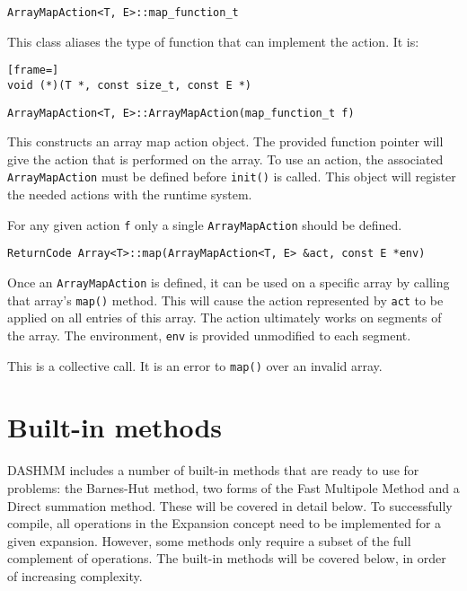 \begin{lstlisting}
ArrayMapAction<T, E>::map_function_t
\end{lstlisting}

\noindent This class aliases the type of function that can implement the
action. It is:

\begin{lstlisting}[frame=]
void (*)(T *, const size_t, const E *)
\end{lstlisting}

\begin{lstlisting}
ArrayMapAction<T, E>::ArrayMapAction(map_function_t f)
\end{lstlisting}

\noindent This constructs an array map action object. The provided function
pointer
will give the action that is performed on the array. To use an action,
the associated \texttt{ArrayMapAction} must be defined before \texttt{init()} is
called. This object will register the needed actions with the runtime system.

For any given action \texttt{f} only a single \texttt{ArrayMapAction}
should be defined.

\begin{lstlisting}
ReturnCode Array<T>::map(ArrayMapAction<T, E> &act, const E *env)
\end{lstlisting}

\noindent Once an \texttt{ArrayMapAction} is defined, it can be used on a
specific array
by calling that array's \texttt{map()} method. This will cause the action
represented by \texttt{act} to be applied on all entries of this array. The
action ultimately works on segments of the array. The environment, \texttt{env}
is provided unmodified to each segment.

This is a collective call. It is an error to \texttt{map()} over an invalid array.


\section{Built-in methods}
\label{sec:bi-met}

DASHMM includes a number of built-in methods that are ready to use for
problems: the Barnes-Hut method, two forms of the Fast Multipole Method and
a Direct summation method. These will be covered in detail below. To
successfully compile, all operations in the Expansion concept need to be
implemented for a given expansion. However, some methods only require a
subset of the full complement of operations. The built-in methods will be
covered below, in order of increasing complexity.

